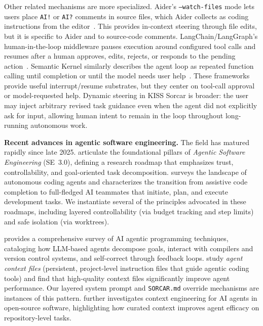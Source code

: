 \documentclass{article}
\begin{document}
Other related mechanisms are more specialized.  Aider's \texttt{--watch-files} mode lets users place \texttt{AI!} or \texttt{AI?} comments in source files, which Aider collects as coding instructions from the editor~\citep{aider2026watch}.  This provides in-context steering through file edits, but it is specific to Aider and to source-code comments.  LangChain/LangGraph's human-in-the-loop middleware pauses execution around configured tool calls and resumes after a human approves, edits, rejects, or responds to the pending action~\citep{langchain2026hitl}.  Semantic Kernel similarly describes the agent loop as repeated function calling until completion or until the model needs user help~\citep{microsoft2025semantickernelplanning}.  These frameworks provide useful interrupt/resume substrates, but they center on tool-call approval or model-requested help.  Dynamic steering in KISS Sorcar is broader: the user may inject arbitrary revised task guidance even when the agent did not explicitly ask for input, allowing human intent to remain in the loop throughout long-running autonomous work.

\textbf{Recent advances in agentic software engineering.} The field has matured rapidly since late 2025. \citet{hassan2025agentic} articulate the foundational pillars of \emph{Agentic Software Engineering} (SE~3.0), defining a research roadmap that emphasizes trust, controllability, and goal-oriented task decomposition.  \citet{li2025rise} surveys the landscape of autonomous coding agents and characterizes the transition from assistive code completion to full-fledged AI teammates that initiate, plan, and execute development tasks.  We instantiate several of the principles advocated in these roadmaps, including layered controllability (via budget tracking and step limits) and safe isolation (via worktrees).

\citet{wang2025agentic} provides a comprehensive survey of AI agentic programming techniques, cataloging how LLM-based agents decompose goals, interact with compilers and version control systems, and self-correct through feedback loops. \citet{chatlatanagulchai2025readmes} study \emph{agent context files} (persistent, project-level instruction files that guide agentic coding tools) and find that high-quality context files significantly improve agent performance.  Our layered system prompt and \texttt{SORCAR.md} override mechanisms are instances of this pattern. \citet{mohsenimofidi2025context} further investigates context engineering for AI agents in open-source software, highlighting how curated context improves agent efficacy on repository-level tasks.
\end{document}
